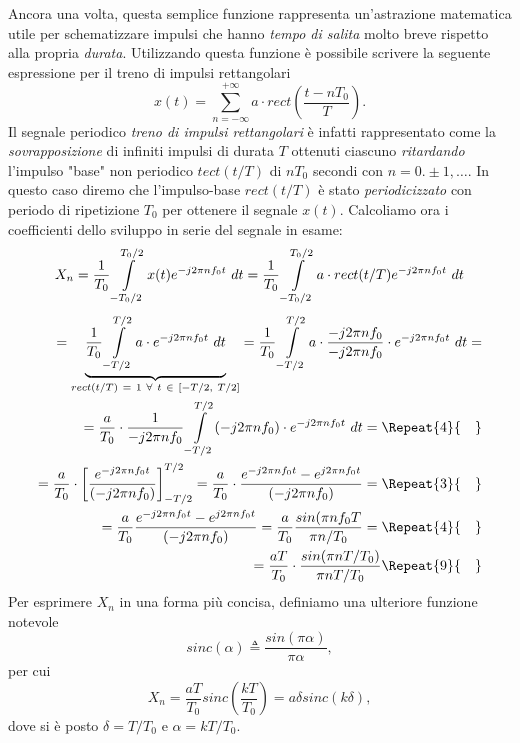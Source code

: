 \documentclass[12pt,oneside,openany]{memoir}
\numberwithin{equation}{subsection}
\newcommand{\quads}[1]{\Repeat{#1}{\quad}}
\newcommand{\dt}{\ dt}
\begin{document}
Ancora una volta, questa semplice funzione rappresenta un'astrazione matematica utile per schematizzare impulsi che hanno \textit{tempo di salita} molto breve rispetto alla propria \textit{durata}. Utilizzando questa funzione \`e possibile scrivere la seguente espressione per il treno di impulsi rettangolari
\begin{equation}
	x(t) = \sum_{n = -\infty}^{+\infty} a \cdot rect\left(\frac{t - nT_0}{T}\right).
\end{equation}
Il segnale periodico \textit{treno di impulsi rettangolari} \`e infatti rappresentato come la \textit{sovrapposizione} di infiniti impulsi di durata $T$ ottenuti ciascuno \textit{ritardando} l'impulso "base" non periodico $tect(t/T)$ di $nT_0$ secondi con $n = 0. \pm1,\dots$. In questo caso diremo che l'impulso-base $rect(t/T)$ \`e stato \textit{periodicizzato} con periodo di ripetizione $T_0$ per ottenere il segnale $x(t)$.
\bigbreak
Calcoliamo ora i coefficienti dello sviluppo in serie del segnale in esame:
\[
	X_n = \frac{1}{T_0} \int\displaylimits_{-T_0/2}^{T_0/2} x(t) e^{-j 2 \pi n f_0 t} \dt = \frac{1}{T_0} \int\displaylimits_{-T_0/2}^{T_0/2} a \cdot rect(t/T) e^{-j 2 \pi n f_0 t} \dt
\]
\begin{equation}
	\begin{split}
		= \underbrace{\frac{1}{T_0} \int\displaylimits_{-T/2}^{T/2} a \cdot e^{-j 2 \pi n f_0 t} \dt}_{rect(t/T) \ = \ 1 \ \forall \ t \ \in \ [-T/2, \ T/2]} = \frac{1}{T_0} \int\displaylimits_{-T/2}^{T/2} a \cdot \frac{-j 2 \pi n f_0}{-j 2 \pi n f_0} \cdot e^{-j 2 \pi n f_0 t} \dt =
		\\
		= \frac{a}{T_0} \cdot \frac{1}{-j 2 \pi n f_0} \int\displaylimits_{-T/2}^{T/2} (-j 2 \pi n f_0) \cdot e^{-j 2 \pi n f_0 t} \dt =
		\quads{4}
		\\
		= \frac{a}{T_0} \cdot \left[\frac{e^{-j 2 \pi n f_0 t}}{(-j 2 \pi n f_0)}\right]_{-T/2}^{T/2} = \frac{a}{T_0} \cdot \frac{e^{-j 2 \pi n f_0 t} - e^{j 2 \pi n f_0 t}}{(-j 2 \pi n f_0)} =
		\quads{3}
		\\
		= \frac{a}{T_0} \frac{e^{-j 2 \pi n f_0 t} - e^{j 2 \pi n f_0 t}}{(-j 2 \pi n f_0)} = \frac{a}{T_0} \frac{sin(\pi n f_0 T}{\pi n / T_0} =
		\quads{4}
		\\
		= \frac{a T}{T_0} \cdot \frac{sin(\pi n T/T_0)}{\pi n T/T_0}
		\quads{9}
		\\
	\end{split}
\end{equation}
Per esprimere $X_n$ in una forma pi\`u concisa, definiamo una ulteriore funzione notevole
\begin{equation}
	sinc(\alpha) \triangleq \frac{sin(\pi \alpha)}{\pi \alpha},
\end{equation}
per cui
\begin{equation}
	X_n = \frac{aT}{T_0} sinc(\frac{kT}{T_0}) = a \delta sinc(k \delta),
\end{equation}
dove si \`e posto $\delta = T/T_0$ e $\alpha = kT/T_0$.
\end{document}
